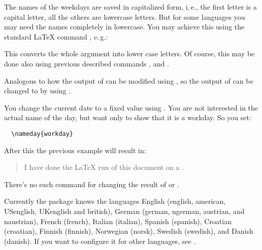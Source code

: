 \begin{Explain}
  The names of the weekdays are saved in capitalized form,
  i.\,e., the first letter is a capital letter, all the others are lowercase
  letters. But for some languages you may need the names completely in
  lowercase. You may achieve this using the standard {\LaTeX} command
  , e.\,g.:
\begin{lstcode}[belowskip=\dp\strutbox]
  \MakeLowercase{\todaysname}
\end{lstcode}
  This converts the whole argument into lower case letters. Of course, this
  may be done also using previous described commands
  ,
   and
  .%
\end{Explain}%
%
%
%


\begin{Declaration}
\end{Declaration}%
%
Analogous to how the output of  can be modified using
, so the output of  can
be changed to  by using .
\begin{Example}
  You change the current date to a fixed value using . You
  are not interested in the actual name of the day, but want only to
  show that it is a workday. So you set:
\begin{lstlisting}
  \nameday{workday}
\end{lstlisting}
  After this the previous example will result in:
  \begin{quote}
    I have done the {\LaTeX} run of this document on a \todaysname.
  \end{quote}
\end{Example}
There's no such command for changing the result of
 or .


%
Currently the package  knows the languages English (english,
american, USenglish, UKenglish and british), German (german, ngerman,
austrian, and naustrian), French
(french), Italian (italian), Spanish (spanish), Croatian (croatian), Finnish
(finnish), Norwegian (norsk), Swedish (swedish), and Danish (danish). If you
want to configure it for other languages, see .


